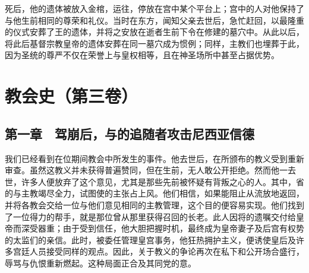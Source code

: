 死后，他的遗体被放入金棺，运往，停放在宫中某个平台上；宫中的人对他保持了与他生前相同的尊荣和礼仪。当时在东方，闻知父亲去世后，急忙赶回，以最隆重的仪式安葬了王的遗体，并将之安放在逝者生前下令在修建的墓穴中。从此以后，将此后基督宗教皇帝的遗体安葬在同一墓穴成为惯例；同样，主教们也埋葬于此，因为圣统的尊严不仅在荣誉上与皇权相等，且在神圣场所中甚至占据优势。\par



\section{教会史（第三卷）}


\subsection{第一章　驾崩后，与的追随者攻击尼西亚信德}

我们已经看到在位期间教会中所发生的事件。他去世后，在所颁布的教义受到重新审查。虽然这教义并未获得普遍赞同，但在生前，无人敢公开拒绝。然而他一去世，许多人便放弃了这个意见，尤其是那些先前被怀疑有背叛之心的人。其中，省的与主教竭尽全力，试图使的主张占上风。他们相信，如果能阻止从流放地返回，并将各教会交给一位与他们意见相同的主教管理，这个目的便容易实现。他们找到了一位得力的帮手，就是那位曾从那里获得召回的长老。此人因将的遗嘱交付给皇帝而深受器重；由于受到信任，他大胆把握时机，最终成为皇帝妻子及后宫有权势的太监们的亲信。此时，被委任管理皇宫事务，他狂热拥护主义，便诱使皇后及许多宫廷人员接受同样的观点。因此，关于教义的争论再次在私下和公开场合盛行，辱骂与仇恨重新燃起。这种局面正合及其同党的意。\par

